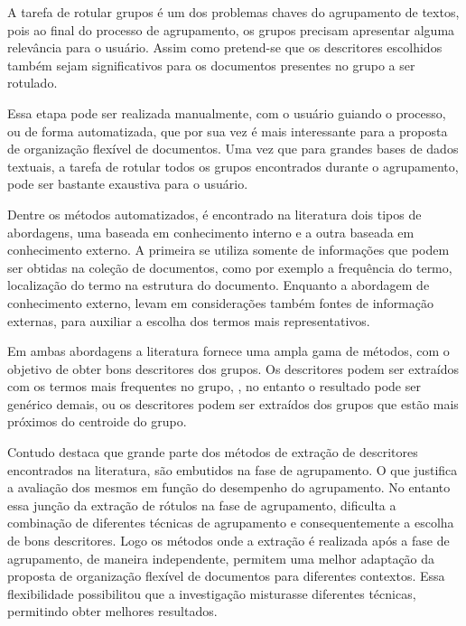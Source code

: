 A tarefa de rotular grupos é um dos problemas chaves do agrupamento de textos, pois ao final do
processo de agrupamento, os grupos precisam apresentar alguma relevância para o
usuário\cite{Zhang2008}. Assim como pretend-se que os descritores escolhidos também sejam
significativos para os documentos presentes no grupo a ser rotulado. 

Essa etapa pode ser realizada manualmente, com o usuário guiando o processo, ou de forma
automatizada, que por sua vez é mais interessante para a proposta de organização flexível de
documentos. Uma vez que para grandes bases de dados textuais, a tarefa de rotular todos os grupos
encontrados durante o agrupamento, pode ser bastante exaustiva para o usuário.

Dentre os métodos automatizados, é encontrado na literatura dois tipos de abordagens, uma baseada em
conhecimento interno e a outra baseada em conhecimento externo\cite{Nogueira2013}.  A primeira se
utiliza somente de informações que podem ser obtidas na coleção de documentos, como por exemplo a
frequência do termo, localização do termo na estrutura do documento.  Enquanto a abordagem de
conhecimento externo, levam em considerações também fontes de informação externas, para auxiliar a
escolha dos termos mais representativos. 

Em ambas abordagens a literatura fornece uma ampla gama de métodos, com o objetivo de obter bons
descritores dos grupos. Os descritores podem ser extraídos com os termos mais frequentes no grupo, ,
no entanto o resultado pode ser genérico demais\cite{Pucktada2006}, ou os descritores podem ser
extraídos dos grupos que estão mais próximos do centroide do grupo.

Contudo \cite{Nogueira2013} destaca que grande parte dos métodos de extração de descritores
encontrados na literatura, são embutidos na fase de agrupamento. O que justifica a avaliação dos
mesmos em função do desempenho do agrupamento. No entanto essa junção da extração de rótulos na fase
de agrupamento, dificulta a combinação de diferentes técnicas de agrupamento e consequentemente a
escolha de bons descritores. Logo os métodos onde a extração é realizada após a fase de agrupamento,
de maneira independente, permitem uma melhor adaptação da proposta de organização flexível de
documentos para diferentes contextos. Essa flexibilidade possibilitou que a investigação misturasse
diferentes técnicas, permitindo obter melhores resultados.





